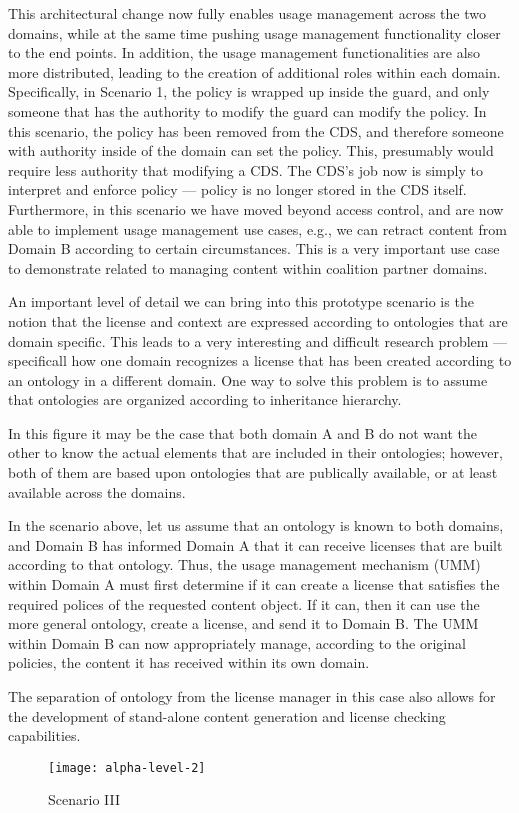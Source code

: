 This architectural change now fully enables usage management across the two domains, while at the same time pushing usage management functionality closer to the end points. In addition, the usage management functionalities are also more distributed, leading to the creation of additional roles within each domain. Specifically, in Scenario 1, the policy is wrapped up inside the guard, and only someone that has the authority to modify the guard can modify the policy. In this scenario, the policy has been removed from the CDS, and therefore someone with authority inside of the domain can set the policy. This, presumably would require less authority that modifying a CDS. The CDS's job now is simply to interpret and enforce policy --- policy is no longer stored in the CDS itself. Furthermore, in this scenario we have moved beyond access control, and are now able to implement usage management use cases, e.g., we can retract content from Domain B according to certain circumstances. This is a very important use case to demonstrate related to managing content within coalition partner domains.

An important level of detail we can bring into this prototype scenario is the notion that the license and context are expressed according to ontologies that are domain specific. This leads to a very interesting and difficult research problem --- specificall how one domain recognizes a license that has been created according to an ontology in a different domain. One way to solve this problem is to assume that ontologies are organized according to inheritance hierarchy.

In this figure it may be the case that both domain A and B do not want the other to know the actual elements that are included in their ontologies; however, both of them are based upon ontologies that are publically available, or at least available across the domains.

In the scenario above, let us assume that an ontology is known to both domains, and Domain B has informed Domain A that it can receive licenses that are built according to that ontology. Thus, the usage management mechanism (UMM) within Domain A must first determine if it can create a license that satisfies the required polices of the requested content object. If it can, then it can use the more general ontology, create a license, and send it to Domain B. The UMM within Domain B can now appropriately manage, according to the original policies, the content it has received within its own domain.

The separation of ontology from the license manager in this case also allows for the development of stand-alone content generation and license checking capabilities.

\begin{figure}[!t]
\centering
\texttt{[image: alpha-level-2]}
\caption{Scenario III}
\label{fig:model:alpha-level-2}
\end{figure}